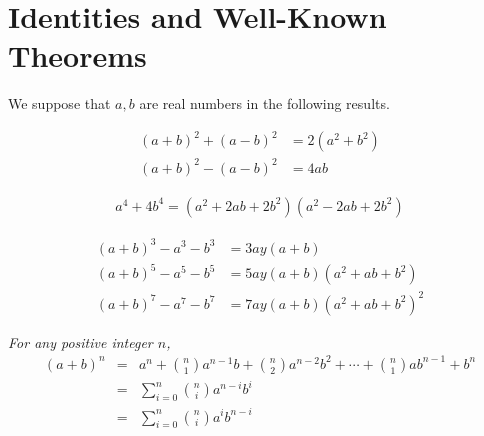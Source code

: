 \documentclass[main.tex]{subfile}
\begin{document}
\noappendicestocpagenum
\addappheadtotoc
\begin{appendix}\label{ch:appendices}
	\chapter*{Identities and Well-Known Theorems}\label{ch:null}

	We suppose that $a,b$ are real numbers in the following results\watermark.

	\begin{identity}\label{id:diffsqr}
		\begin{align*}
			(a+b)^2+(a-b)^2 &= 2(a^2+b^2)\\
			(a+b)^2-(a-b)^2 & = 4ab
		\end{align*}
	\end{identity}

	\begin{identity}\slshape
		\begin{align*}
			a^4+4b^4=(a^2+2ab+2b^2)(a^2-2ab+2b^2)
		\end{align*}
	\end{identity}

	\begin{identity}
		\begin{align*}
			(a+b)^3 - a^3 - b^3 &= 3ay(a+b)\\
			(a+b)^5 - a^5 - b^5 &= 5ay(a+b)(a^2+ab+b^2)\\
			(a+b)^7 - a^7 - b^7 &= 7ay(a+b)(a^2+ab+b^2)^2
		\end{align*}
	\end{identity}

	\begin{identity}\slshape\label{thm:binomial-theorem}
		For any positive integer $n$,
		\begin{eqnarray*}
			(a+b)^n & = & a^n+\binom{n}{1}a^{n-1}b+\binom{n}{2}a^{n-2}b^2+\cdots+\binom{n}{1}ab^{n-1}+b^n\\
			& = & \sum_{i=0}^{n}\binom{n}{i}a^{n-i}b^i\\
			& = & \sum_{i=0}^{n}\binom{n}{i}a^ib^{n-i}
		\end{eqnarray*}
	\end{identity}


\end{appendix}
\end{document}
